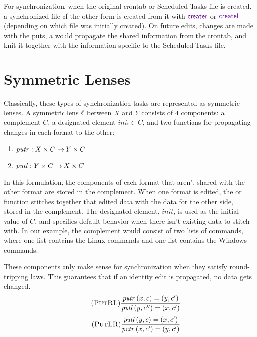 \documentclass[acmsmall,screen,anonymous]{acmart}
\begin{document}
For synchronization, when the original crontab or Scheduled Tasks file is
created, a synchronized file of the other form is created from it with
$\CreateR$ or $\CreateL$ (depending on which file was initially created). On
future edits, changes are made with the puts, a \PutR would propagate the shared
information from the crontab, and knit it together with the information specific
to the Scheduled Tasks file.


\section{Symmetric Lenses}
\label{sec:symmetric-lenses}

Classically, these types of synchronization tasks are represented as symmetric
lenses. A symmetric lens $\mathit{\ell}$ between $X$ and $Y$ consists of 4 components: a
complement $C$, a designated element $init \in C$, and two functions for
propagating changes in each format to the other:
\begin{enumerate}
\item $\mathit{putr} : X \times C \rightarrow Y \times C$
\item $\mathit{putl} : Y \times C \rightarrow X \times C$
\end{enumerate}
In this formulation, the components of each format that aren't shared with the
other format are stored in the complement. When one format is edited, the \PutR
or \PutL function stitches together that edited data with the data for the other
side, stored in the complement.  The designated element, $init$, is used as the
initial value of $C$, and specifies default behavior when there isn't existing
data to stitch with.  In our example, the complement would consist of two lists
of commands, where one list contains the Linux commands and one list contains
the Windows commands.

These components only make sense for synchronization when they satisfy
round-tripping laws.  This guarantees that if an identity edit is propagated, no
data gets changed.
\begin{equation}
  \tag{\PutRL}
  \frac{\PutRSymOf{(x,c)} = (y,c')}{\PutLSymOf{(y,c'')} = (x,c')}
\end{equation}
\begin{equation}
  \tag{\PutLR}
  \frac{\PutLSymOf{(y,c)} = (x,c')}{\PutRSymOf{(x,c')} = (y,c')}
\end{equation}
\end{document}
